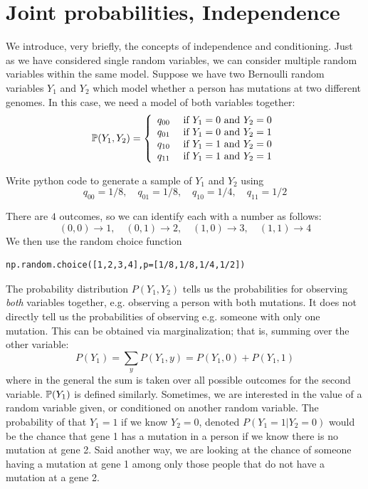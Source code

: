 \section{Joint probabilities, Independence} We introduce, very briefly, the concepts of independence and conditioning. Just as we have considered single random variables, we can consider multiple random variables within the same model. Suppose we have two Bernoulli random variables $Y_1$ and $Y_2$ which model whether a person has mutations at two different genomes.  In this case, we need a model of both variables together:
\begin{equation}
\mathbb P(Y_1,Y_2) = \left\{ \begin{array}{cc}
q_{00} & \text{ if }Y_1=0 \text{ and } Y_2 = 0\\
q_{01} & \text{ if }Y_1=0 \text{ and } Y_2 = 1\\
q_{10} & \text{ if }Y_1=1 \text{ and } Y_2 = 0\\
q_{11} & \text{ if }Y_1=1 \text{ and } Y_2 = 1\\
\end{array}
 \right.
\end{equation}


\begin{example}
Write python code to generate a sample of $Y_1$ and $Y_2$ using
\begin{equation}
q_{00} = 1/8,\quad q_{01} = 1/8,\quad q_{10} = 1/4, \quad q_{11} = 1/2
\end{equation}
\end{example}
\begin{solution}
There are $4$ outcomes, so we can identify each with a number as follows:
\begin{equation}
(0,0) \to 1,\quad (0,1) \to 2,\quad (1,0) \to 3,\quad (1,1) \to 4
\end{equation}
We then use the random choice function
\begin{Verbatim}
np.random.choice([1,2,3,4],p=[1/8,1/8,1/4,1/2])
\end{Verbatim}
\end{solution}



The probability distribution $P(Y_1,Y_2)$ tells us the probabilities for observing \emph{both} variables together, e.g. observing a person with both mutations. It does not directly tell us the probabilities of observing e.g. someone with only one mutation. This can be obtained via marginalization; that is, summing over the other variable:
\begin{equation}
P(Y_1)  = \sum_{y}P(Y_1,y) = P(Y_1,0)  +P(Y_1,1)
\end{equation}
where in the general the sum is taken over all possible outcomes for the second variable. $\mathbb P(Y_1)$ is defined similarly. Sometimes, we are interested in the value of a random variable given, or {\dfn conditioned on} another random variable. The probability of that $Y_1 = 1$ if we know $Y_2 = 0$, denoted $P(Y_1=1|Y_2=0)$ would be the chance that gene 1 has a mutation in a person if we know there is no mutation at gene 2. Said another way, we are looking at the chance of someone having a mutation at gene 1 among only those people that do not have a mutation at a gene 2. 


